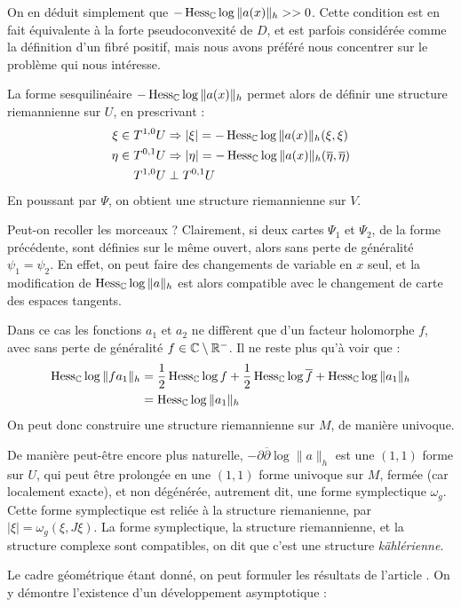 On en déduit simplement que $-\operatorname{Hess}_{\mathbb{C}} \log \|a(x)\|_h >> 0$. Cette condition est en fait équivalente à la forte pseudoconvexité de $D$, et est parfois considérée comme la définition d'un fibré positif, mais nous avons préféré nous concentrer sur le problème qui nous intéresse.

La forme sesquilinéaire $-\operatorname{Hess}_{\mathbb{C}}\log \|a(x)\|_h$ permet alors de définir une structure riemannienne sur $U$, en prescrivant :
\begin{align*}
	\xi \in T^{1,0}U&\Rightarrow |\xi|=-\operatorname{Hess}_{\mathbb{C}}\log \|a(x)\|_h(\xi,\xi)\\
	\eta \in T^{0,1}U&\Rightarrow |\eta|=-\operatorname{Hess}_{\mathbb{C}}\log \|a(x)\|_h(\overline{\eta},\overline{\eta})\\
	T^{1,0}  U & \perp T^{0,1}U
\end{align*}
En poussant par $\Psi$, on obtient une structure riemannienne sur $V$.

Peut-on recoller les morceaux ? Clairement, si deux cartes $\Psi_1$ et $\Psi_2$, de la forme précédente, sont définies sur le même ouvert, alors sans perte de généralité $\psi_1=\psi_2$. En effet, on peut faire des changements de variable en $x$ seul, et la modification de $\operatorname{Hess}_{\mathbb{C}}\log \|a\|_h$  est alors compatible avec le changement de carte des espaces tangents.

Dans ce cas les fonctions $a_1$ et $a_2$ ne diffèrent que d'un facteur holomorphe $f$, avec sans perte de généralité $f \in \mathbb{C} \setminus \mathbb{R}^-$. Il ne reste plus qu'à voir que :
\begin{align*}
	\operatorname{Hess}_{\mathbb{C}}\log \|fa_1\|_h &= \frac 12 \operatorname{Hess}_{\mathbb{C}} \log f + \frac 12 \operatorname{Hess}_{\mathbb{C}} \log \overline{f} + \operatorname{Hess}_{\mathbb{C}} \log \|a_1\|_h\\
		&= \operatorname{Hess}_{\mathbb{C}} \log \|a_1\|_h
\end{align*}
On peut donc construire une structure riemannienne sur $M$, de manière univoque. 

De manière peut-être encore plus naturelle, $-\partial \overline{\partial}\log \|a\|_h$ est une $(1,1)$ forme sur $U$, qui peut être prolongée en une $(1,1)$ forme univoque sur $M$, fermée (car localement exacte), et non dégénérée, autrement dit, une forme symplectique $\omega_g$. Cette forme symplectique est reliée à la structure riemanienne, par $|\xi|=\omega_g(\xi,J\xi)$. La forme symplectique, la structure riemannienne, et la structure complexe sont compatibles, on dit que c'est une structure \emph{kählérienne}.

Le cadre géométrique étant donné, on peut formuler les résultats de l'article \cite{Zelditch2000}. On y démontre l'existence d'un développement asymptotique :

